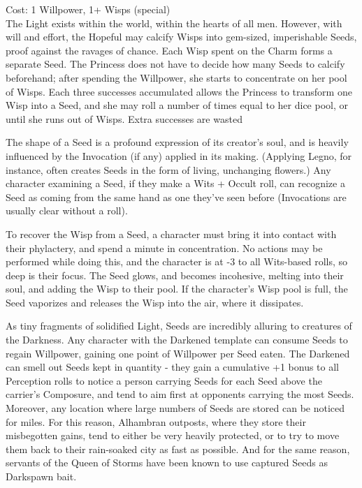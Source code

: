 \noindent Cost: 1 Willpower, 1+ Wisps (special)\\

\noindent The Light exists within the world, within the hearts of all men. However, with will and effort, the Hopeful may calcify Wisps into gem-sized, imperishable Seeds, proof against the ravages of chance. Each Wisp spent on the Charm forms a separate Seed. The Princess does not have to decide how many Seeds to calcify beforehand; after spending the Willpower, she starts to concentrate on her pool of Wisps. Each three successes accumulated allows the Princess to transform one Wisp into a Seed, and she may roll a number of times equal to her dice pool, or until she runs out of Wisps. Extra successes are wasted

The shape of a Seed is a profound expression of its creator's soul, and is heavily influenced by the Invocation (if any) applied in its making. (Applying Legno, for instance, often creates Seeds in the form of living, unchanging flowers.) Any character examining a Seed, if they make a Wits + Occult roll, can recognize a Seed as coming from the same hand as one they've seen before (Invocations are usually clear without a roll). 

To recover the Wisp from a Seed, a character must bring it into contact with their phylactery, and spend a minute in concentration. No actions may be performed while doing this, and the character is at -3 to all Wits-based rolls, so deep is their focus. The Seed glows, and becomes incohesive, melting into their soul, and adding the Wisp to their pool. If the character's Wisp pool is full, the Seed vaporizes and releases the Wisp into the air, where it dissipates.

As tiny fragments of solidified Light, Seeds are incredibly alluring to creatures of the Darkness. Any character with the Darkened template can consume Seeds to regain Willpower, gaining one point of Willpower per Seed eaten. The Darkened can smell out Seeds kept in quantity - they gain a cumulative +1 bonus to all Perception rolls to notice a person carrying Seeds for each Seed above the carrier's Composure, and tend to aim first at opponents carrying the most Seeds. Moreover, any location where large numbers of Seeds are stored can be noticed for miles. For this reason, Alhambran outposts, where they store their misbegotten gains, tend to either be very heavily protected, or to try to move them back to their rain-soaked city as fast as possible. And for the same reason, servants of the Queen of Storms have been known to use captured Seeds as Darkspawn bait.

